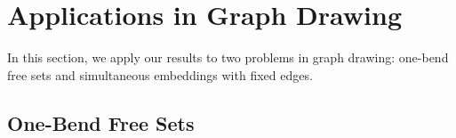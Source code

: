 \documentclass{patmorin}
\begin{document}





\section{Applications in Graph Drawing}
\label{gd}
In this section, we apply our results to two problems in graph drawing: one-bend free sets and simultaneous embeddings with fixed edges.

\subsection{One-Bend Free Sets}
\end{document}
